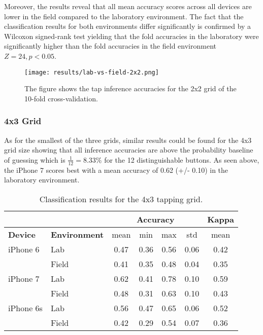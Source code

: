 Moreover, the results reveal that all mean accuracy scores across all devices are lower in the field compared to the laboratory environment. The fact that the classification results for both environments differ significantly is confirmed by a Wilcoxon signed-rank test yielding that the fold accuracies in the laboratory were significantly higher than the fold accuracies in the field environment $Z = 24, p < 0.05$.

\begin{figure}[h!]
  \centering
  \texttt{[image: results/lab-vs-field-2x2.png]}
  \caption{The figure shows the tap inference accuracies for the 2x2 grid of the 10-fold cross-validation.} \label{fig:lab2x2}
\end{figure}

\subsubsection{4x3 Grid}

As for the smallest of the three grids, similar results could be found for the 4x3 grid size showing that all inference accuracies are above the probability baseline of guessing which is $\frac{1}{12}= 8.33\%$ for the 12 distinguishable buttons. As seen above, the iPhone 7 scores best with a mean accuracy of 0.62 (+/- 0.10) in the laboratory environment.

\begin{table}[h!]
  \centering
\begin{tabular}{|l|l|c|c|c|c|c|}
  \cline{3-7}
  \multicolumn{2}{c}{} & \multicolumn{4}{|c|}{\textbf{Accuracy}} & \textbf{Kappa} \\
  \hline
  \textbf{Device} & \textbf{Environment} & mean &   min &   max  & std &  mean \\
  \hline
  iPhone 6 & Lab &      0.47 &     0.36 &     0.56 &     0.06 &        0.42 \\
  & Field &      0.41 &     0.35 &     0.48 &     0.04 &        0.35 \\
  \hline
iPhone 7 & Lab &      0.62 &     0.41 &     0.78 &     0.10 &        0.59 \\
  & Field &      0.48 &     0.31 &     0.63 &     0.10 &        0.43 \\
  \hline
iPhone 6s & Lab &      0.56 &     0.47 &     0.65 &     0.06 &        0.52 \\
  & Field &      0.42 &     0.29 &     0.54 &     0.07 &        0.36 \\
  \hline
\end{tabular}
  \caption{Classification results for the 4x3 tapping grid.}
\end{table}


